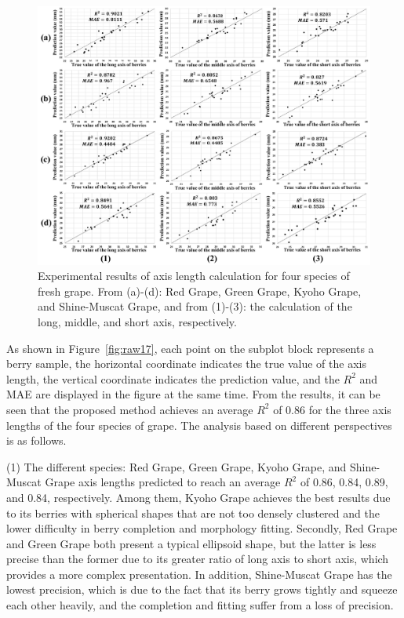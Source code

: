 \documentclass[12pt]{article}
\begin{document}
\begin{figure}[hbt!]
    \centering
    \includegraphics[width=1\textwidth]{figures/Figure14.pdf}
    \caption{Experimental results of axis length calculation for four species of fresh grape. From (a)-(d): Red Grape, Green Grape, Kyoho Grape, and Shine-Muscat Grape, and from (1)-(3): the calculation of the long, middle, and short axis, respectively.}
    \label{fig:raw16}
\end{figure}

As shown in Figure~\ref{fig:raw17}, each point on the subplot block represents a berry sample, the horizontal coordinate indicates the true value of the axis length, the vertical coordinate indicates the prediction value, and the $R^2$ and MAE are displayed in the figure at the same time. 
From the results, it can be seen that the proposed method achieves an average $R^2$ of 0.86 for the three axis lengths of the four species of grape. 
The analysis based on different perspectives is as follows.

(1) The different species: Red Grape, Green Grape, Kyoho Grape, and Shine-Muscat Grape axis lengths predicted to reach an average $R^2$ of 0.86, 0.84, 0.89, and 0.84, respectively. 
Among them, Kyoho Grape achieves the best results due to its berries with spherical shapes that are not too densely clustered and the lower difficulty in berry completion and morphology fitting. 
Secondly, Red Grape and Green Grape both present a typical ellipsoid shape, but the latter is less precise than the former due to its greater ratio of long axis to short axis, which provides a more complex presentation. 
In addition, Shine-Muscat Grape has the lowest precision, which is due to the fact that its berry grows tightly and squeeze each other heavily, and the completion and fitting suffer from a loss of precision.
\end{document}
